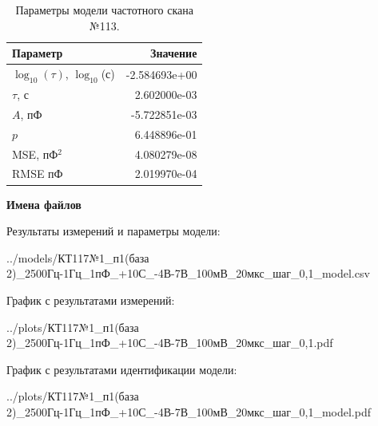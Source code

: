 \begin{table}[!ht]
    \centering
    \caption{Параметры модели частотного скана №113.}
    \begin{tabular}{|l|r|}
        \hline
        Параметр                                       & Значение                  \\ \hline
        $\log_{10}(\tau)$, $\log_{10}$(с)              & -2.584693e+00             \\ \hline
        $\tau$, с                                      & 2.602000e-03              \\ \hline
        $A$, пФ                                        & -5.722851e-03             \\ \hline
        $p$                                            & 6.448896e-01              \\ \hline
        MSE, пФ$^2$                                    & 4.080279e-08              \\ \hline
        RMSE пФ                                        & 2.019970e-04              \\ \hline
    \end{tabular}
    \label{table:frequency_scan_model_113}
\end{table}

\textbf{Имена файлов}

Результаты измерений и параметры модели:

\scriptsize../models/КТ117№1\_п1(база 2)\_2500Гц-1Гц\_1пФ\_+10С\_-4В-7В\_100мВ\_20мкс\_шаг\_0,1\_model.csv
\normalsize

График с результатами измерений:

\scriptsize../plots/КТ117№1\_п1(база 2)\_2500Гц-1Гц\_1пФ\_+10С\_-4В-7В\_100мВ\_20мкс\_шаг\_0,1.pdf
\normalsize

График с результатами идентификации модели:

\scriptsize../plots/КТ117№1\_п1(база 2)\_2500Гц-1Гц\_1пФ\_+10С\_-4В-7В\_100мВ\_20мкс\_шаг\_0,1\_model.pdf
\normalsize

